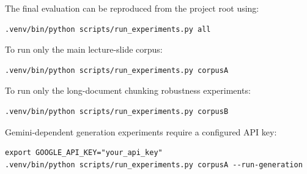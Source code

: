 \documentclass[11pt,a4paper]{article}
\begin{document}
The final evaluation can be reproduced from the project root using:

\begin{lstlisting}[caption={Run all final evaluations and ablations.},label={lst:run-all}]
.venv/bin/python scripts/run_experiments.py all
\end{lstlisting}

To run only the main lecture-slide corpus:

\begin{lstlisting}[caption={Run Corpus A evaluation.},label={lst:run-corpus-a}]
.venv/bin/python scripts/run_experiments.py corpusA
\end{lstlisting}

To run only the long-document chunking robustness experiments:

\begin{lstlisting}[caption={Run Corpus B evaluation.},label={lst:run-corpus-b}]
.venv/bin/python scripts/run_experiments.py corpusB
\end{lstlisting}

Gemini-dependent generation experiments require a configured API key:

\begin{lstlisting}[caption={Run generation evaluation with Gemini enabled.},label={lst:run-generation}]
export GOOGLE_API_KEY="your_api_key"
.venv/bin/python scripts/run_experiments.py corpusA --run-generation
\end{lstlisting}
\end{document}
